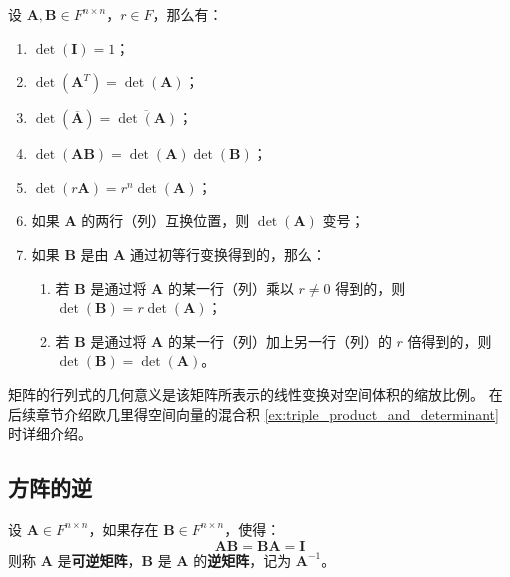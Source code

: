 \vspace{1em}

\begin{proposition}[行列式的性质]
    设 $\mathbf{A},\mathbf{B} \in F^{n \times n}$，$r\in F$，那么有：
    \begin{enumerate}
        \item $\det(\mathbf{I}) = 1$；
        \item $\det(\mathbf{A}^T) = \det(\mathbf{A})$；
        \item $\det(\overline{\mathbf{A}}) = \overline{\det(\mathbf{A})}$；
        \item $\det(\mathbf{A}\mathbf{B}) = \det(\mathbf{A})\det(\mathbf{B})$；
        \item $\det(r\mathbf{A}) = r^n \det(\mathbf{A})$；
        \item 如果 $\mathbf{A}$ 的两行（列）互换位置，则 $\det(\mathbf{A})$ 变号；
        \item 如果 $\mathbf{B}$ 是由 $\mathbf{A}$ 通过初等行变换得到的，那么：
        \begin{enumerate}
            \item 若 $\mathbf{B}$ 是通过将 $\mathbf{A}$ 的某一行（列）乘以 $r\neq 0$ 得到的，则 $\det(\mathbf{B}) = r\det(\mathbf{A})$；
            \item 若 $\mathbf{B}$ 是通过将 $\mathbf{A}$ 的某一行（列）加上另一行（列）的 $r$ 倍得到的，则 $\det(\mathbf{B}) = \det(\mathbf{A})$。
        \end{enumerate}
    \end{enumerate}
    \label{prop:determinant_property}
\end{proposition}
\vspace{1em}

\begin{note}
    矩阵的行列式的几何意义是该矩阵所表示的线性变换对空间体积的缩放比例。
    在后续章节介绍欧几里得空间向量的混合积 \ref{ex:triple_product_and_determinant} 时详细介绍。
\end{note}

\vspace{1em}
\subsection{方阵的逆}

\begin{definition}
    设 $\mathbf{A} \in F^{n \times n}$，如果存在 $\mathbf{B} \in F^{n \times n}$，使得：
    \[
        \mathbf{A}\mathbf{B} = \mathbf{B}\mathbf{A} = \mathbf{I}
    \]
    则称 $\mathbf{A}$ 是\textbf{可逆矩阵}，$\mathbf{B}$ 是 $\mathbf{A}$ 的\textbf{逆矩阵}，记为 $\mathbf{A}^{-1}$。
\end{definition}

